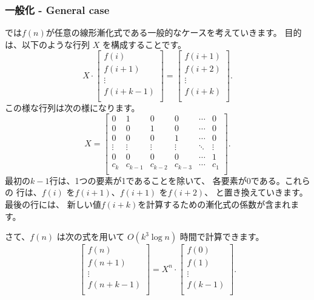 \subsubsection{一般化 - General case}


では$f(n)$が任意の線形漸化式である一般的なケースを考えていきます。
目的は、以下のような行列 $X$ を構成することです。
\[ X \cdot
 \begin{bmatrix}
  f(i) \\
  f(i+1) \\
  \vdots \\
  f(i+k-1) \\
 \end{bmatrix}
=
 \begin{bmatrix}
  f(i+1) \\
  f(i+2) \\
  \vdots \\
  f(i+k) \\
 \end{bmatrix}.
\]
この様な行列は次の様になります。
\[
X =
 \begin{bmatrix}
  0 & 1 & 0 & 0 & \cdots & 0 \\
  0 & 0 & 1 & 0 & \cdots & 0 \\
  0 & 0 & 0 & 1 & \cdots & 0 \\
  \vdots & \vdots & \vdots & \vdots & \ddots & \vdots \\
  0 & 0 & 0 & 0 & \cdots & 1 \\
  c_k & c_{k-1} & c_{k-2} & c_{k-3} & \cdots & c_1 \\
 \end{bmatrix}.
\]
最初の$k - 1$行は、1つの要素が1であることを除いて、
各要素が0である。これらの 行は、$f (i)$ を$f (i + 1)$、$f (i + 1)$ を$f (i + 2)$、
と置き換えていきます。
最後の行には、 新しい値$f(i+k)$を計算するための漸化式の係数が含まれます。
\begin{samepage}
さて、$f (n)$ は次の式を用いて $O(k^3 \log n)$  時間で計算できます。
\[
 \begin{bmatrix}
  f(n) \\
  f(n+1) \\
  \vdots \\
  f(n+k-1) \\
 \end{bmatrix}
=
X^n \cdot
 \begin{bmatrix}
  f(0) \\
  f(1) \\
  \vdots \\
  f(k-1) \\
 \end{bmatrix}.
\]
\end{samepage}

